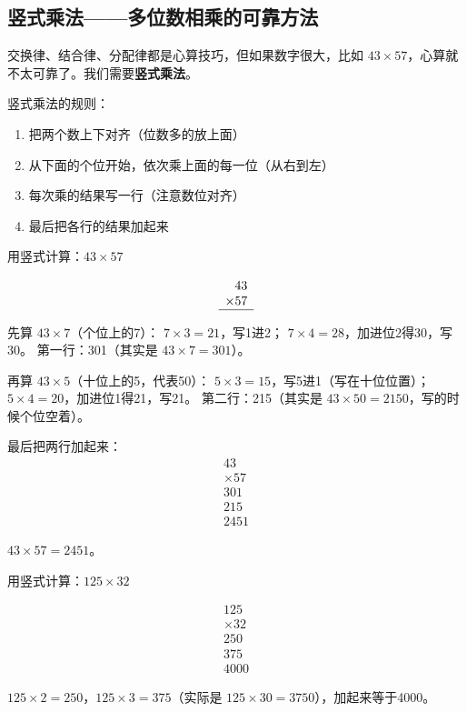 \subsection*{竖式乘法——多位数相乘的可靠方法}

交换律、结合律、分配律都是心算技巧，但如果数字很大，比如 $43\times57$，心算就不太可靠了。我们需要\textbf{竖式乘法}。

竖式乘法的规则：
\begin{enumerate}
  \item 把两个数上下对齐（位数多的放上面）
  \item 从下面的个位开始，依次乘上面的每一位（从右到左）
  \item 每次乘的结果写一行（注意数位对齐）
  \item 最后把各行的结果加起来
\end{enumerate}

\begin{example}
用竖式计算：$43\times57$
\end{example}
\begin{solution}
\[
\begin{array}{r}
  43 \\
\times 57 \\ \hline
\end{array}
\]

先算 $43\times7$（个位上的7）：
$7\times3=21$，写1进2；
$7\times4=28$，加进位2得30，写30。
第一行：301（其实是 $43\times7=301$）。

再算 $43\times5$（十位上的5，代表50）：
$5\times3=15$，写5进1（写在十位位置）；
$5\times4=20$，加进位1得21，写21。
第二行：215（其实是 $43\times50=2150$，写的时候个位空着）。

最后把两行加起来：
\[
\begin{array}{r}
  43 \\
\times 57 \\ \hline
  301 \\
 215\phantom{0} \\ \hline
  2451
\end{array}
\]

$43\times57 = 2451$。
\end{solution}

\begin{example}
用竖式计算：$125\times32$
\end{example}
\begin{solution}
\[
\begin{array}{r}
  125 \\
\times 32 \\ \hline
  250 \\
 375\phantom{0} \\ \hline
  4000
\end{array}
\]

$125\times2=250$，$125\times3=375$（实际是 $125\times30=3750$），加起来等于4000。
\end{solution}

